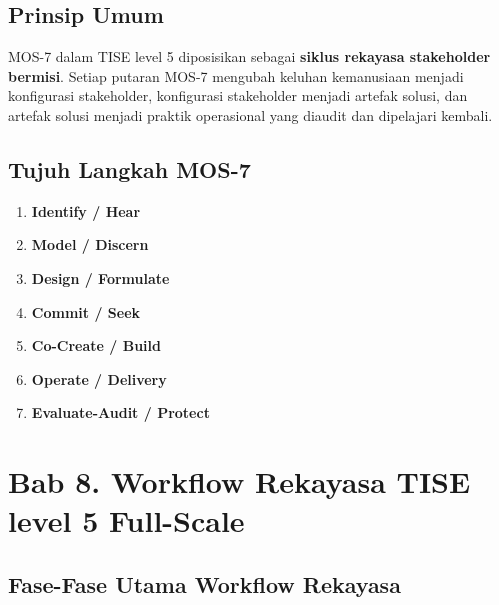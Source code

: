 \documentclass[
  letterpaper,
  DIV=11,
  numbers=noendperiod]{scrreprt}
\providecommand{\tightlist}{%
  \setlength{\itemsep}{0pt}\setlength{\parskip}{0pt}}
\begin{document}

\section*{Prinsip Umum}\label{prinsip-umum}


MOS-7 dalam TISE level 5 diposisikan sebagai \textbf{siklus rekayasa
stakeholder bermisi}. Setiap putaran MOS-7 mengubah keluhan kemanusiaan
menjadi konfigurasi stakeholder, konfigurasi stakeholder menjadi artefak
solusi, dan artefak solusi menjadi praktik operasional yang diaudit dan
dipelajari kembali.

\section*{Tujuh Langkah MOS-7}\label{tujuh-langkah-mos-7}


\begin{enumerate}
\def\labelenumi{\arabic{enumi}.}
\tightlist
\item
  \textbf{Identify / Hear}
\item
  \textbf{Model / Discern}
\item
  \textbf{Design / Formulate}
\item
  \textbf{Commit / Seek}
\item
  \textbf{Co-Create / Build}
\item
  \textbf{Operate / Delivery}
\item
  \textbf{Evaluate-Audit / Protect}
\end{enumerate}


\chapter*{Bab 8. Workflow Rekayasa TISE level 5
Full-Scale}\label{bab-8.-workflow-rekayasa-tise-level-5-full-scale}


\section*{Fase-Fase Utama Workflow
Rekayasa}\label{fase-fase-utama-workflow-rekayasa}
\end{document}
